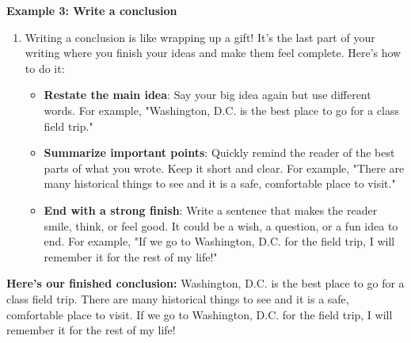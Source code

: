 \documentclass[12pt]{article}
\begin{document}
\begin{tcolorbox}[colframe=black!60, colback=white, 
coltitle=black, colbacktitle=black!15, fonttitle=\bfseries\Large, 
title=Examples, halign title=center, left=10pt, right=10pt, top=10pt, bottom=15pt]

\textbf{Example 3: Write a conclusion}
\begin{enumerate}
    \item Writing a conclusion is like wrapping up a gift! It’s the last part of your writing where you finish your ideas and make them feel complete. Here’s how to do it:
    \begin{itemize}
        \item \textbf{Restate the main idea}: Say your big idea again but use different words. For example, "Washington, D.C. is the best place to go for a class field trip."
    \item \textbf{Summarize important points}: Quickly remind the reader of the best parts of what you wrote. Keep it short and clear. For example, "There are many historical things to see and it is a safe, comfortable place to visit."
    \item \textbf{End with a strong finish}: Write a sentence that makes the reader smile, think, or feel good. It could be a wish, a question, or a fun idea to end. For example, "If we go to Washington, D.C. for the field trip, I will remember it for the rest of my life!"

\end{itemize}
 
\end{enumerate}
 
\textbf{Here's our finished conclusion: }Washington, D.C. is the best place to go for a class field trip. There are many historical things to see and it is a safe, comfortable place to visit. If we go to Washington, D.C. for the field trip, I will remember it for the rest of my life!




     \end{tcolorbox}
\end{document}
